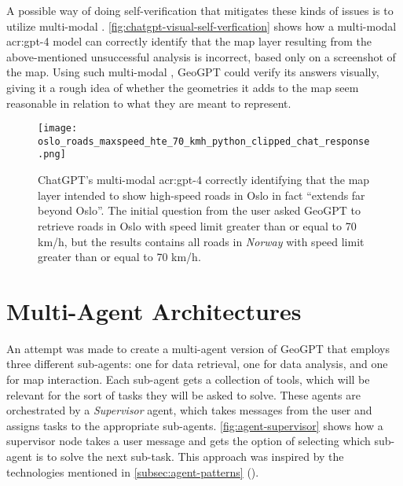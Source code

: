 A possible way of doing self-verification that mitigates these kinds of issues is to utilize multi-modal . \autoref{fig:chatgpt-visual-self-verfication} shows how a multi-modal \acrshort{acr:gpt}-4 model can correctly identify that the map layer resulting from the above-mentioned unsuccessful analysis is incorrect, based only on a screenshot of the map. Using such multi-modal , GeoGPT could verify its answers visually, giving it a rough idea of whether the geometries it adds to the map seem reasonable in relation to what they are meant to represent.

\begin{figure}
    \centering
    \texttt{[image: oslo\_roads\_maxspeed\_hte\_70\_kmh\_python\_clipped\_chat\_response.png]}
    \caption[Using the multi-modal GPT-4 model to identify errors in an image of a GeoGPT-generated road layer]{ChatGPT's multi-modal \acrshort{acr:gpt}-4 correctly identifying that the map layer intended to show high-speed roads in Oslo in fact \enquote{extends far beyond Oslo}. The initial question from the user asked GeoGPT to retrieve roads in Oslo with speed limit greater than or equal to 70 km/h, but the results contains all roads in \textit{Norway} with speed limit greater than or equal to 70 km/h.}
    \label{fig:chatgpt-visual-self-verfication}
\end{figure}

\FloatBarrier

\section{Multi-Agent Architectures}
\label{sec:multi-agent-architectures}

An attempt was made to create a multi-agent version of GeoGPT that employs three different sub-agents: one for data retrieval, one for data analysis, and one for map interaction. Each sub-agent gets a collection of tools, which will be relevant for the sort of tasks they will be asked to solve. These agents are orchestrated by a \textit{Supervisor} agent, which takes messages from the user and assigns tasks to the appropriate sub-agents. \autoref{fig:agent-supervisor} shows how a supervisor node takes a user message and gets the option of selecting which sub-agent is to solve the next sub-task. This approach was inspired by the technologies mentioned in \autoref{subsec:agent-patterns} ().


